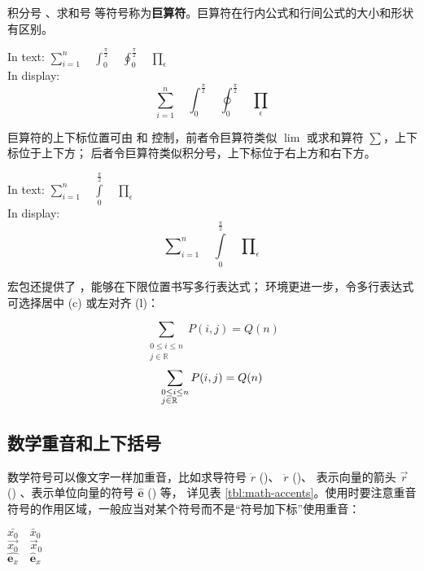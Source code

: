 积分号 、求和号  等符号称为\textbf{巨算符}。巨算符在行内公式和行间公式的大小和形状有区别。
\begin{example}
In text: 
$\sum_{i=1}^n \quad
\int_0^{\frac{\pi}{2}} \quad
\oint_0^{\frac{\pi}{2}} \quad
\prod_\epsilon $ \\
In display:
\[\sum_{i=1}^n \quad
\int_0^{\frac{\pi}{2}} \quad
\oint_0^{\frac{\pi}{2}} \quad
\prod_\epsilon \]
\end{example}

巨算符的上下标位置可由  和  控制，前者令巨算符类似 $\lim$ 或求和算符 $\sum$，上下标位于上下方；
后者令巨算符类似积分号，上下标位于右上方和右下方。
\begin{example}
In text: 
$\sum\limits_{i=1}^n \quad
\int\limits_0^{\frac{\pi}{2}} \quad
\prod\limits_\epsilon $ \\
In display:
\[\sum\nolimits_{i=1}^n \quad
\int\limits_0^{\frac{\pi}{2}} \quad
\prod\nolimits_\epsilon \]
\end{example}

 宏包还提供了 ，能够在下限位置书写多行表达式； 
环境更进一步，令多行表达式可选择居中 (c) 或左对齐 (l)：
\begin{example}
\[
\sum_{\substack{0\le i\le n \\
  j\in \mathbb{R}}}
P(i,j) = Q(n)
\]
\[
\sum_{\begin{subarray}{l}
  0\le i\le n \\
  j\in \mathbb{R}
\end{subarray}}
P(i,j) = Q(n)
\]
\end{example}

\subsection{数学重音和上下括号}\label{subsec:math-accents}

数学符号可以像文字一样加重音，比如求导符号 $\dot{r}$ ()、 $\ddot{r}$ ()、
表示向量的箭头 $\vec{r}$ () 、表示单位向量的符号 $\hat{\mathbf{e}}$ () 等，
详见表 \ref{tbl:math-accents}。使用时要注意重音符号的作用区域，一般应当对某个符号而不是“符号加下标”使用重音：
\begin{example}
$\bar{x_0} \quad \bar{x}_0$\\[5pt]
$\vec{x_0} \quad \vec{x}_0$\\[5pt]
$\hat{\mathbf{e}_x} \quad
 \hat{\mathbf{e}}_x$
\end{example}

